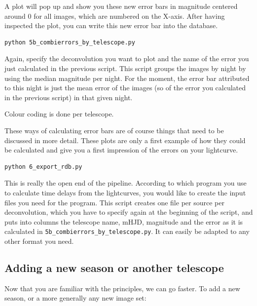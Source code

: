 A plot will pop up and show you these new error bars in magnitude centered around 0 for all images, which are numbered on the X-axis. After having inspected the plot, you can write this new error bar into the database.

\begin{Verbatim}
python 5b_combierrors_by_telescope.py
\end{Verbatim}

Again, specify the deconvolution you want to plot and the name of the error you just calculated in the previous script. This script groups the images by night by using the median magnitude per night. For the moment, the error bar attributed to this night is just the mean error of the images (so of the error you calculated in the previous script) in that given night. 

Colour coding is done per telescope.

These ways of calculating error bars are of course things that need to be discussed in more detail. These plots are only a first example of how they could be calculated and give you a first impression of the errors on your lightcurve.

\begin{Verbatim}
python 6_export_rdb.py
\end{Verbatim}

This is really the open end of the pipeline. According to which program you use to calculate time delays from the lightcurves, you would like to create the input files you need for the program. This script creates one file per source per deconvolution, which you have to specify again at the beginning of the script, and puts into columns the telescope name, mHJD, magnitude and the error as it is calculated in \verb+5b_combierrors_by_telescope.py+. It can easily be adapted to any other format you need.

\subsection{Adding a new season or another telescope}

Now that you are familiar with the principles, we can go faster. To add a new season, or a more generally any new image set:

